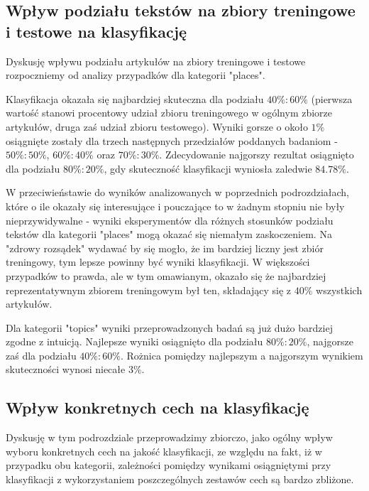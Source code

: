 \documentclass{classrep}
\begin{document}
\subsection{Wpływ podziału tekstów na zbiory treningowe i testowe na klasyfikację}
Dyskusję wpływu podziału artykułów na zbiory treningowe i testowe rozpoczniemy od analizy przypadków dla kategorii "places".  \newline

Klasyfikacja okazała się najbardziej skuteczna dla podziału $40\%:60\%$ (pierwsza wartość stanowi procentowy udział zbioru treningowego w ogólnym zbiorze artykułów, druga zaś udział zbioru testowego). Wyniki gorsze o około $1\%$ osiągnięte zostały dla trzech następnych przedziałów poddanych badaniom - $50\%:50\%$, $60\%:40\%$ oraz $70\%:30\%$. Zdecydowanie najgorszy rezultat osiągnięto dla podziału $80\%:20\%$, gdy skuteczność klasyfikacji wyniosła zaledwie $84.78\%$.\newline

W przeciwieństawie do wyników analizowanych w poprzednich podrozdziałach, które o ile okazały się interesujące i pouczające to w żadnym stopniu nie były nieprzywidywalne - wyniki eksperymentów dla różnych stosunków podziału tekstów dla kategorii "places" mogą okazać się niemałym zaskoczeniem. Na "zdrowy rozsądek" wydawać by się mogło, że im bardziej liczny jest zbiór treningowy, tym lepsze powinny być wyniki klasyfikacji. W większości przypadków to prawda, ale w tym omawianym, okazało się że najbardziej reprezentatywnym zbiorem treningowym był ten, składający się z $40\%$ wszystkich artykułów.\newline

Dla kategorii "topics" wyniki przeprowadzonych badań są już dużo bardziej zgodne z intuicją. Najlepsze wyniki osiągnięto dla podziału $80\%:20\%$, najgorsze zaś dla podziału $40\%:60\%$. Rożnica pomiędzy najlepszym a najgorszym wynikiem skuteczności wynosi niecałe $3\%$.

\subsection{Wpływ konkretnych cech na klasyfikację}
Dyskusję w tym podrozdziale przeprowadzimy zbiorczo, jako ogólny wpływ wyboru konkretnych cech na jakość klasyfikacji, ze względu na fakt, iż w przypadku obu kategorii, zależności pomiędzy wynikami osiągniętymi przy klasyfikacji z wykorzystaniem poszczególnych zestawów cech są bardzo zbliżone.\newline
\end{document}
